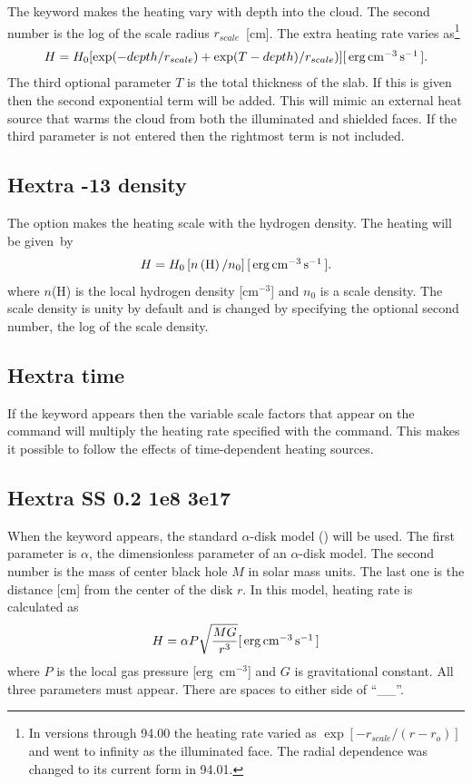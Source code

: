 The keyword  makes the heating vary with depth
into the cloud.
The
second number is the log of the scale radius $r_{scale}$~[cm].
The extra heating
rate varies as\footnote{In versions through 94.00 the heating rate
varied as
$\exp[-r_{scale}/(r-r_o)]$ and went to infinity as the illuminated face.  The radial
dependence was changed to its current form in 94.01.}
\begin{equation}
H = H_0 [\exp ( - depth/r_{scale} ) + \exp (T - depth)/r_{scale} )]
 [\ergpccmps ].%
\end{equation}
The third optional parameter $T$ is the total thickness of the slab.
If this
is given then the second exponential term will be added.
This will mimic
an external heat source that warms the cloud from both the illuminated and
shielded faces.
If the third parameter is not entered then the rightmost
term is not included.

\subsection{Hextra -13 density }

The  option makes the heating scale with the
hydrogen density.
The heating will be given~by
\begin{equation}
H = H_0 \left[ {n\left( \mathrm{H} \right)/n_0 } \right]
[\mbox{${\rm\thinspace erg}{\rm\thinspace cm}^{-3}{\rm\thinspace s}^{-1}\,$} ].
\end{equation}
where $n$(H) is the local hydrogen density [cm$^{-3}$]
and $n_0$ is a scale density.
The scale density is unity by default and is changed by specifying the
optional second number, the log of the scale density.

\subsection{Hextra time}

If the  keyword appears then the variable
scale factors that appear
on the  command will multiply the heating
rate specified with the  command.
This makes it possible to follow
the effects of time-dependent heating sources.

\subsection{Hextra SS 0.2 1e8 3e17}

When the keyword  appears, the standard $\alpha$-disk model
(\citet{Shakura1973}) will be used. The first parameter is $\alpha$, 
the dimensionless parameter of an $\alpha$-disk model. 
The second number is the mass of center black hole $M$ in solar mass units. 
The last one is the distance [cm] from the center of the disk $r$. 
In this model, heating rate is calculated as
\begin{equation}
H=\alpha P\sqrt{\frac{MG}{r^3}}[\mbox{${\rm\thinspace erg}{\rm\thinspace cm}^{-3}{\rm\thinspace s}^{-1}\,$}]
\end{equation}
where $P$ is the local gas pressure [erg~cm$^{-3}$] 
and $G$ is gravitational constant. 
All three parameters must appear.
There are spaces to either side of
``\_\_''. 

